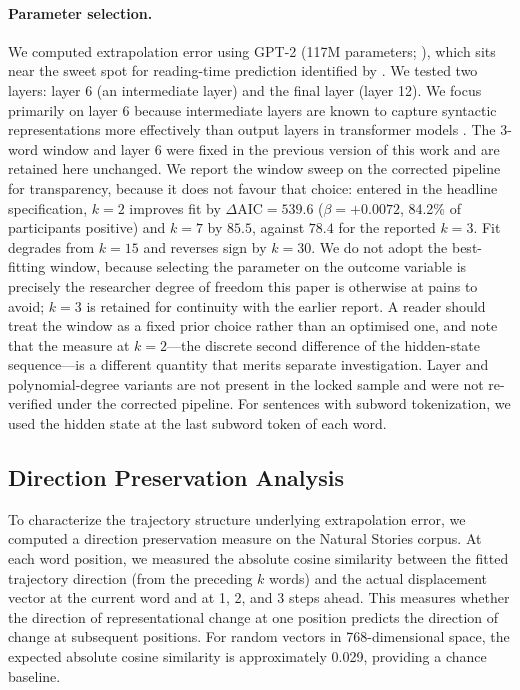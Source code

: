 \documentclass[12pt]{article}
\newcommand{\new}[1]{#1}   %
\begin{document}
\paragraph{Parameter selection.} We computed extrapolation error using GPT-2 (117M parameters; \citealp{radford2019}), which sits near the sweet spot for reading-time prediction identified by \citet{oh2023a}. We tested two layers: layer 6 (an intermediate layer) and the final layer (layer 12). We focus primarily on layer 6 because intermediate layers are known to capture syntactic representations more effectively than output layers in transformer models \citep{hewitt2019,jawahar2019}. \new{The 3-word window and layer 6 were fixed in the previous version of this work and are retained here unchanged. We report the window sweep on the corrected pipeline for transparency, because it does not favour that choice: entered in the headline specification, $k = 2$ improves fit by $\Delta\text{AIC} = 539.6$ ($\beta = +0.0072$, 84.2\% of participants positive) and $k = 7$ by $85.5$, against $78.4$ for the reported $k = 3$. Fit degrades from $k = 15$ and reverses sign by $k = 30$. We do not adopt the best-fitting window, because selecting the parameter on the outcome variable is precisely the researcher degree of freedom this paper is otherwise at pains to avoid; $k = 3$ is retained for continuity with the earlier report. A reader should treat the window as a fixed prior choice rather than an optimised one, and note that the measure at $k = 2$---the discrete second difference of the hidden-state sequence---is a different quantity that merits separate investigation. Layer and polynomial-degree variants are not present in the locked sample and were not re-verified under the corrected pipeline.} For sentences with subword tokenization, we used the hidden state at the last subword token of each word.

\subsection{Direction Preservation Analysis}

To characterize the trajectory structure underlying extrapolation error, we computed a direction preservation measure on the Natural Stories corpus. At each word position, we measured the absolute cosine similarity between the fitted trajectory direction (from the preceding $k$ words) and the actual displacement vector at the current word and at 1, 2, and 3 steps ahead. This measures whether the direction of representational change at one position predicts the direction of change at subsequent positions. For random vectors in 768-dimensional space, the expected absolute cosine similarity is approximately 0.029, providing a chance baseline.
\end{document}
